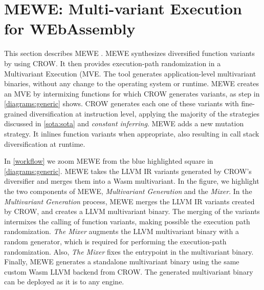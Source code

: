 \section{MEWE: Multi-variant Execution for WEbAssembly}
\label{section:mewe}

\renewcommand{\tool}{MEWE\xspace}
\newcommand{\repourl}{TODO}
This section describes MEWE \cite{MEWE}. 
\tool synthesizes diversified function variants by using CROW.
It then provides execution-path randomization in a Multivariant Execution (MVE.
The tool generates application-level multivariant binaries, without any change to the operating system or \wasm runtime.
MEWE creates an MVE by intermixing functions for which CROW generates variants, as step  in \autoref{diagrams:generic} shows.
CROW generates each one of these variants with fine-grained diversification at instruction level, applying the majority of the strategies discussed in \autoref{sota:sota} and \emph{constant inferring}. \tool adds a new mutation strategy. It inlines function variants when appropriate, also resulting in call stack diversification at runtime.

In \autoref{workflow} we zoom MEWE from the blue highlighted square in \autoref{diagrams:generic}. MEWE takes the LLVM IR variants generated by CROW's diversifier and merges them into a Wasm multivariant.
In the figure, we highlight the two components of MEWE, \emph{Multivariant Generation} and the \emph{Mixer}.
In the \emph{Multivariant Generation} process, 
MEWE merges the LLVM IR variants created by CROW, and creates a LLVM multivariant binary.
The merging of the variants intermixes the calling of function variants, making possible the execution path randomization.
\emph{The Mixer} augments the LLVM multivariant binary with a random generator, which is required for performing the execution-path randomization. 
Also, \emph{The Mixer} fixes the entrypoint in the multivariant binary.
Finally, MEWE generates a standalone multivariant \wasm binary  using the same custom Wasm LLVM backend from CROW.
The generated multivariant \wasm binary can be deployed as it is to any engine.  

